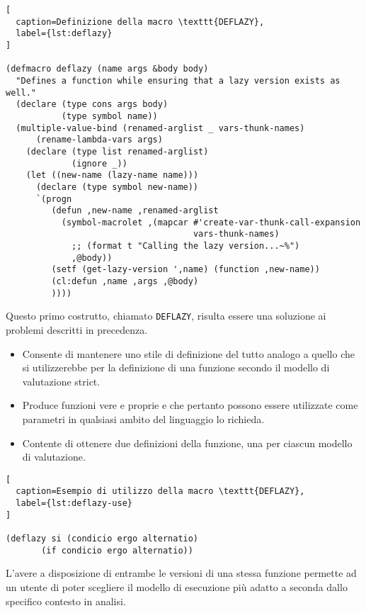 \begin{lstlisting}[
  caption=Definizione della macro \texttt{DEFLAZY},
  label={lst:deflazy}
]

(defmacro deflazy (name args &body body)
  "Defines a function while ensuring that a lazy version exists as well."
  (declare (type cons args body)
           (type symbol name))
  (multiple-value-bind (renamed-arglist _ vars-thunk-names)
      (rename-lambda-vars args)
    (declare (type list renamed-arglist)
             (ignore _))
    (let ((new-name (lazy-name name)))
      (declare (type symbol new-name))
      `(progn
         (defun ,new-name ,renamed-arglist
           (symbol-macrolet ,(mapcar #'create-var-thunk-call-expansion
                                     vars-thunk-names)
             ;; (format t "Calling the lazy version...~%")
             ,@body))
         (setf (get-lazy-version ',name) (function ,new-name))
         (cl:defun ,name ,args ,@body)
         ))))

\end{lstlisting}

Questo primo costrutto, chiamato \texttt{DEFLAZY}, risulta essere una soluzione
ai problemi descritti in precedenza.

\begin{itemize}

\item Consente di mantenere uno stile di definizione del tutto analogo a quello
che si utilizzerebbe per la definizione di una funzione secondo il modello di
valutazione strict.

\item Produce funzioni vere e proprie e che pertanto possono essere utilizzate
come parametri in qualsiasi ambito del linguaggio lo richieda.

\item Contente di ottenere due definizioni della funzione, una per ciascun
modello di valutazione.

\end{itemize}

\begin{lstlisting}[
  caption=Esempio di utilizzo della macro \texttt{DEFLAZY},
  label={lst:deflazy-use}
]

(deflazy si (condicio ergo alternatio)
       (if condicio ergo alternatio))

\end{lstlisting}

L'avere a disposizione di entrambe le versioni di una stessa funzione permette
ad un utente di poter scegliere il modello di esecuzione più adatto a seconda
dallo specifico contesto in analisi.\\

